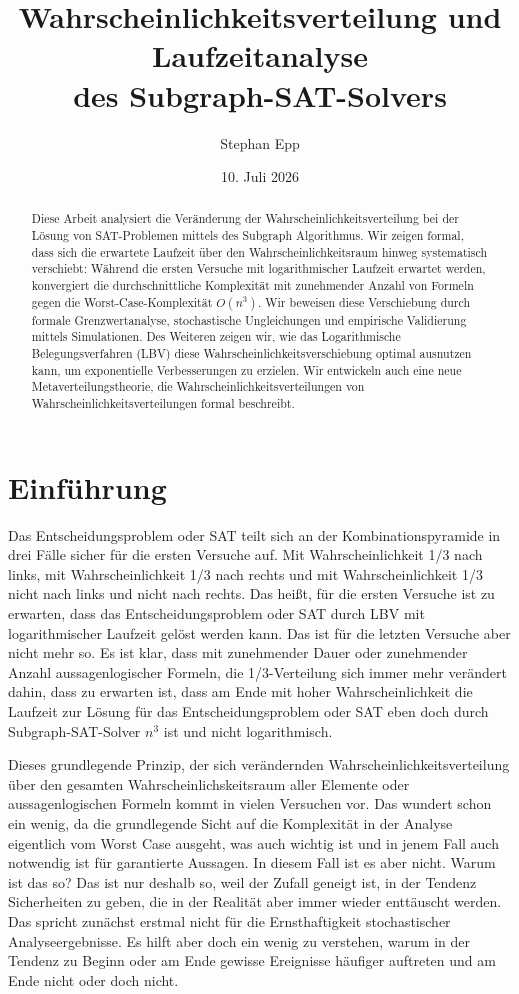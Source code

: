 ﻿\documentclass[a4paper,12pt]{article}
\title{Wahrscheinlichkeitsverteilung und Laufzeitanalyse \\ des Subgraph-SAT-Solvers}
\author{Stephan Epp}
\date{10. Juli 2026}
\theoremstyle{definition}
\begin{document}
	
\maketitle

\begin{abstract}
Diese Arbeit analysiert die Veränderung der Wahrscheinlichkeitsverteilung bei der Lösung von SAT-Problemen mittels des Subgraph Algorithmus. Wir zeigen formal, dass sich die erwartete Laufzeit über den Wahrscheinlichkeitsraum hinweg systematisch verschiebt: Während die ersten Versuche mit logarithmischer Laufzeit erwartet werden, konvergiert die durchschnittliche Komplexität mit zunehmender Anzahl von Formeln gegen die Worst-Case-Komplexität $O(n^3)$. Wir beweisen diese Verschiebung durch formale Grenzwertanalyse, stochastische Ungleichungen und empirische Validierung mittels Simulationen. Des Weiteren zeigen wir, wie das Logarithmische Belegungsverfahren (LBV) diese Wahrscheinlichkeitsverschiebung optimal ausnutzen kann, um exponentielle Verbesserungen zu erzielen. Wir entwickeln auch eine neue Metaverteilungstheorie, die Wahrscheinlichkeitsverteilungen von Wahrscheinlichkeitsverteilungen formal beschreibt.
\end{abstract}

\tableofcontents
\newpage

\section{Einführung}

Das Entscheidungsproblem oder SAT teilt sich an der Kombinationspyramide in drei Fälle sicher für die ersten Versuche auf. Mit Wahrscheinlichkeit 1/3 nach links, mit Wahrscheinlichkeit 1/3 nach rechts und mit Wahrscheinlichkeit 1/3 nicht nach links und nicht nach rechts. Das heißt, für die ersten Versuche ist zu erwarten, dass das Entscheidungsproblem oder SAT durch LBV mit logarithmischer Laufzeit gelöst werden kann. Das ist für die letzten Versuche aber nicht mehr so. Es ist klar, dass mit zunehmender Dauer oder zunehmender Anzahl aussagenlogischer Formeln, die 1/3-Verteilung sich immer mehr verändert dahin, dass zu erwarten ist, dass am Ende mit hoher Wahrscheinlichkeit die Laufzeit zur Lösung für das Entscheidungsproblem oder SAT eben doch durch Subgraph-SAT-Solver $n^3$ ist und nicht logarithmisch.

Dieses grundlegende Prinzip, der sich verändernden Wahrscheinlichkeitsverteilung über den gesamten Wahrscheinlichskeitsraum aller Elemente oder aussagenlogischen Formeln kommt in vielen Versuchen vor. Das wundert schon ein wenig, da die grundlegende Sicht auf die Komplexität in der Analyse eigentlich vom Worst Case ausgeht, was auch wichtig ist und in jenem Fall auch notwendig ist für garantierte Aussagen. In diesem Fall ist es aber nicht. Warum ist das so? Das ist nur deshalb so, weil der Zufall geneigt ist, in der Tendenz Sicherheiten zu geben, die in der Realität aber immer wieder enttäuscht werden. Das spricht zunächst erstmal nicht für die Ernsthaftigkeit stochastischer Analyseergebnisse. Es hilft aber doch ein wenig zu verstehen, warum in der Tendenz zu Beginn oder am Ende gewisse Ereignisse häufiger auftreten und am Ende nicht oder doch nicht.
\end{document}
